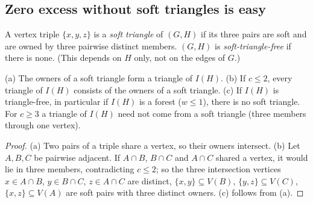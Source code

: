 \subsection{Zero excess without soft triangles is easy}
\begin{definition}\label{def:softtri}
A vertex triple $\{x,y,z\}$ is a \emph{soft triangle} of $(G,H)$ if its three pairs are soft and are owned by three pairwise distinct members. $(G,H)$ is \emph{soft-triangle-free} if there is none. (This depends on $H$ only, not on the edges of $G$.)
\end{definition}
\begin{lemma}\label{lem:tri}
(a) The owners of a soft triangle form a triangle of $I(H)$. (b) If $c\le2$, every triangle of $I(H)$ consists of the owners of a soft triangle. (c) If $I(H)$ is triangle-free, in particular if $I(H)$ is a forest ($w\le1$), there is no soft triangle. For $c\ge3$ a triangle of $I(H)$ need not come from a soft triangle (three members through one vertex).
\end{lemma}
\begin{proof}
(a) Two pairs of a triple share a vertex, so their owners intersect. (b) Let $A,B,C$ be pairwise adjacent. If $A\cap B$, $B\cap C$ and $A\cap C$ shared a vertex, it would lie in three members, contradicting $c\le2$; so the three intersection vertices $x\in A\cap B$, $y\in B\cap C$, $z\in A\cap C$ are distinct, $\{x,y\}\subseteq V(B)$, $\{y,z\}\subseteq V(C)$, $\{x,z\}\subseteq V(A)$ are soft pairs with three distinct owners. (c) follows from (a).
\end{proof}

